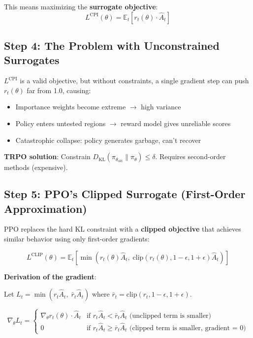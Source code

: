 This means maximizing the \textbf{surrogate objective}: 
\begin{equation}
L^{\text{CPI}}(\theta) = \mathbb{E}_t\left[r_t(\theta) \cdot \hat{A}_t\right]
\end{equation}

\subsection{Step 4: The Problem with Unconstrained Surrogates}
\label{step-4-the-problem-with-unconstrained-surrogates}

$L^{\text{CPI}}$ is a valid objective, but without constraints, a single gradient step can push $r_t(\theta)$ far from 1.0, causing:

\begin{itemize}
  \item Importance weights become extreme $\rightarrow$ high variance
  \item Policy enters untested regions $\rightarrow$ reward model gives unreliable scores
  \item Catastrophic collapse: policy generates garbage, can’t recover
\end{itemize}

\textbf{TRPO solution}: Constrain $D_{\text{KL}}(\pi_{\theta_{\text{old}}} \| \pi_\theta) \leq \delta$. Requires second-order methods (expensive).

\subsection{Step 5: PPO’s Clipped Surrogate (First-Order Approximation)}
\label{step-5-ppos-clipped-surrogate-first-order-approximation}

PPO replaces the hard KL constraint with a \textbf{clipped objective} that achieves similar behavior using only first-order gradients:

\begin{equation}
\boxed{L^{\text{CLIP}}(\theta) = \mathbb{E}_t\left[\min\!\left(r_t(\theta)\hat{A}_t,\;\text{clip}(r_t(\theta), 1{-}\epsilon, 1{+}\epsilon)\hat{A}_t\right)\right]}
\end{equation}

\textbf{Derivation of the gradient}:

Let $L_t = \min(r_t \hat{A}_t,\; \bar{r}_t \hat{A}_t)$ where $\bar{r}_t = \text{clip}(r_t, 1{-}\epsilon, 1{+}\epsilon)$.

\begin{equation}
\nabla_\theta L_t = \begin{cases}
\nabla_\theta r_t(\theta) \cdot \hat{A}_t & \text{if } r_t \hat{A}_t < \bar{r}_t \hat{A}_t \text{ (unclipped term is smaller)} \\
0 & \text{if } r_t \hat{A}_t \geq \bar{r}_t \hat{A}_t \text{ (clipped term is smaller, gradient = 0)}
\end{cases}
\end{equation}

